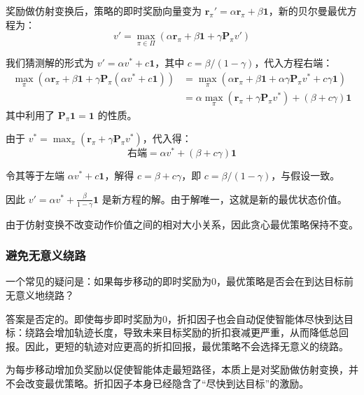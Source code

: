 \documentclass[UTF8]{article}
\begin{document}
\begin{proofbox}
    奖励做仿射变换后，策略的即时奖励向量变为 $\boldsymbol{r}_\pi' = \alpha \boldsymbol{r}_\pi + \beta \boldsymbol{1}$，新的贝尔曼最优方程为：
    \[
    v' = \max_{\pi \in \Pi} \left( \alpha \boldsymbol{r}_\pi + \beta \boldsymbol{1} + \gamma \boldsymbol{P}_\pi v' \right)
    \]

    我们猜测解的形式为 $v' = \alpha v^* + c \boldsymbol{1}$，其中 $c = \beta/(1-\gamma)$，代入方程右端：
    \[
    \begin{aligned}
    \max_\pi \left( \alpha \boldsymbol{r}_\pi + \beta \boldsymbol{1} + \gamma \boldsymbol{P}_\pi (\alpha v^* + c \boldsymbol{1}) \right)
    &= \max_\pi \left( \alpha \boldsymbol{r}_\pi + \beta \boldsymbol{1} + \alpha \gamma \boldsymbol{P}_\pi v^* + c\gamma \boldsymbol{1} \right) \\
    &= \alpha \max_\pi \left( \boldsymbol{r}_\pi + \gamma \boldsymbol{P}_\pi v^* \right) + (\beta + c\gamma) \boldsymbol{1}
    \end{aligned}
    \]
    其中利用了 $\boldsymbol{P}_\pi \boldsymbol{1} = \boldsymbol{1}$ 的性质。

    由于 $v^* = \max_\pi (\boldsymbol{r}_\pi + \gamma \boldsymbol{P}_\pi v^*)$，代入得：
    \[
    \text{右端} = \alpha v^* + (\beta + c\gamma) \boldsymbol{1}
    \]

    令其等于左端 $\alpha v^* + c \boldsymbol{1}$，解得 $c = \beta + c\gamma$，即 $c = \beta/(1-\gamma)$，与假设一致。

    因此 $v' = \alpha v^* + \frac{\beta}{1-\gamma} \boldsymbol{1}$ 是新方程的解。由于解唯一，这就是新的最优状态价值。

    由于仿射变换不改变动作价值之间的相对大小关系，因此贪心最优策略保持不变。
\end{proofbox}

\subsubsection*{避免无意义绕路}

一个常见的疑问是：如果每步移动的即时奖励为0，最优策略是否会在到达目标前无意义地绕路？

答案是否定的。即使每步即时奖励为0，折扣因子也会自动促使智能体尽快到达目标：绕路会增加轨迹长度，导致未来目标奖励的折扣衰减更严重，从而降低总回报。因此，更短的轨迹对应更高的折扣回报，最优策略不会选择无意义的绕路。

\begin{remarkbox}
    为每步移动增加负奖励以促使智能体走最短路径，本质上是对奖励做仿射变换，并不会改变最优策略。折扣因子本身已经隐含了“尽快到达目标”的激励。
\end{remarkbox}
\end{document}
